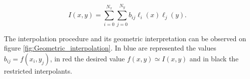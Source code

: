      \begin{equation}
     {I}(x,y) = \sum_{i=0}^{N_x} \sum_{j=0}^{N_y} b_{ij} \ell_i(x) \ell_j(y) .
     \end{equation}
     
     The interpolation procedure and its geometric interpretation can be observed on figure \ref{fig:Geometric_interpolation}. In blue are represented the values $b_{ij}=f(x_i,y_j)$, in red the desired value $f(x,y)\simeq I(x,y)$ and in black the restricted interpolants.
     
     
     
     
     